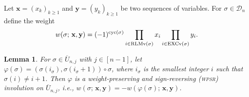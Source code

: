\documentclass[12pt,reqno]{amsart}
\numberwithin{equation}{section}
\newcommand\cyc{\mathop{ \rm cyc}}
\def\D{\mathcal{D}}
\def\x{\mathbf{ x}}
\def\y{\mathbf{ y}}
\def\cyc{\mathop{\rm cyc}}
\newtheorem{lem}{Lemma}
\begin{document}
Let $\x=(x_k)_{k\geq 1}$ and $\y=(y_k)_{k\geq 1}$ be two sequences of variables.
For $\sigma\in\D_{n}$ define the weight
\begin{align}\label{weight:v}
 w(\sigma;\, {\x},{\y})=(-1)^{\cyc(\sigma)}
 \prod_{i\in \mathrm{RLMv}(\sigma)}x_i \prod_{i\in \mathrm{EXCv}(\sigma)}y_i.
\end{align}


\begin{lem}\label{lemma:key}
For $\sigma\in  \overline{U}_{n,j}$ with $j\in [n-1]$, let 
$\varphi(\sigma)=(\sigma(i_{\sigma}), \sigma(i_{\sigma}+1))\circ\sigma$, where $i_\sigma$ is  the smallest integer $i$ such that $\sigma(i)\neq i+1$.
Then $\varphi$ 
is a {\it weight-preserving and  sign-reversing} (\textsc{wpsr}) involution  on $\overline{U}_{n,j}$, i.e., 
$w(\sigma; \,\x,{\y})=-w(\varphi(\sigma);\,\x,\y)$.
\end{lem}
\end{document}

